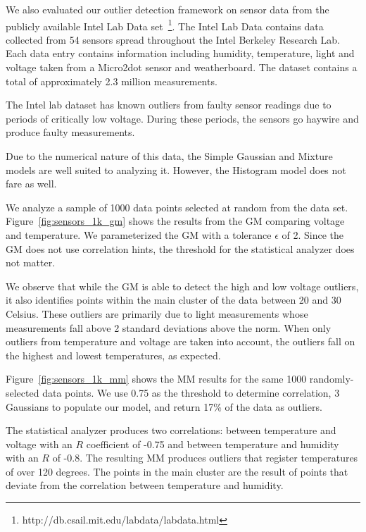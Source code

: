 
We also evaluated our outlier detection framework on sensor data from the publicly available Intel Lab Data set~\footnote{http://db.csail.mit.edu/labdata/labdata.html}. The Intel Lab Data contains data collected from 54 sensors spread throughout the Intel Berkeley Research Lab. Each data entry contains information including humidity, temperature, light and voltage taken from a Micro2dot sensor and weatherboard. The dataset contains a total of approximately 2.3 million measurements.

The Intel lab dataset has known outliers from faulty sensor readings due to periods of critically low voltage.
During these periods, the sensors go haywire and produce faulty measurements.

Due to the numerical nature of this data, the Simple Gaussian and Mixture models are well suited to analyzing it. However, the Histogram model does not fare as well.

We analyze a sample of 1000 data points selected at random from the data set. Figure~\ref{fig:sensors_1k_gm} shows the results from the GM comparing voltage and temperature.
We parameterized the GM with a tolerance $\epsilon$ of 2.
Since the GM does not use correlation hints, the threshold for the statistical analyzer does not matter.

We observe that while the GM is able to detect the high and low voltage outliers, it also identifies points within the main cluster of the data between 20 and 30 Celsius.
These outliers are primarily due to light measurements whose measurements fall above 2 standard deviations above the norm.
When only outliers from temperature and voltage are taken into account, the outliers fall on the highest and lowest temperatures, as expected.

Figure~\ref{fig:sensors_1k_mm} shows the MM results for the same 1000 randomly-selected data points.
We use 0.75 as the threshold to determine correlation, 3 Gaussians to populate our model, and return 17\% of the data as outliers.

The statistical analyzer produces two correlations: between temperature and voltage with an $R$ coefficient of -0.75 and between temperature and humidity with an $R$ of -0.8.
The resulting MM produces outliers that register temperatures of over 120 degrees.
The points in the main cluster are the result of points that deviate from the correlation between temperature and humidity.


